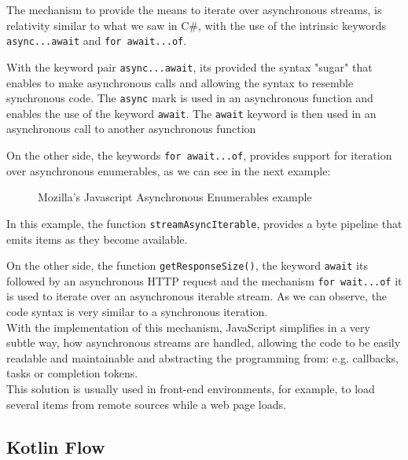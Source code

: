 	The mechanism to provide the means to iterate over asynchronous streams, is relativity similar to what we saw in C\#, with the use of the intrinsic keywords \texttt{async...await} and \texttt{for await...of}.

	With the keyword pair \texttt{async...await}, its provided the syntax "sugar" that enables to make asynchronous calls and allowing the syntax to resemble synchronous code. 
	The \texttt{async} mark is used in an asynchronous function and enables the use of the keyword \texttt{await}. The \texttt{await} keyword is then used in an asynchronous call to another asynchronous function

	On the other side, the keywords \texttt{for await...of}, provides support for iteration over asynchronous enumerables, as we can see in the next example:

	\begin{figure}[H]
		\centering
		\caption{Mozilla's Javascript Asynchronous Enumerables example}
		\label{fig:enumex2}
	\end{figure}

In this example, the function \texttt{streamAsyncIterable}, provides a byte pipeline that emits items as they become available.

On the other side, the function \texttt{getResponseSize()}, the keyword \texttt{await} its followed by an asynchronous HTTP request and the mechanism \texttt{for wait...of} it is used to iterate over an asynchronous iterable stream. As we can observe, the code syntax is very similar to a synchronous iteration. \\

With the implementation of this mechanism, JavaScript simplifies in a very subtle way, how asynchronous streams are handled, allowing the code to be easily readable and maintainable and abstracting the programming from: e.g. callbacks, tasks or completion tokens.\\

This solution is usually used in front-end environments, for example, to load several items from remote sources while a web page loads.
\clearpage

\subsection{Kotlin Flow}

